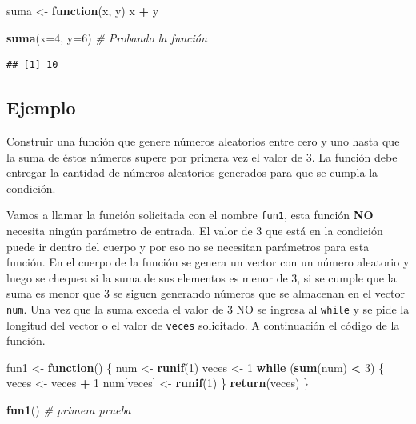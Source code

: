 \documentclass[10pt,]{krantz}
\makeatletter
\newenvironment{Shaded}{\begin{snugshade}}{\end{snugshade}}
\newcommand{\KeywordTok}[1]{\textcolor[rgb]{0.13,0.29,0.53}{\textbf{#1}}}
\newcommand{\DataTypeTok}[1]{\textcolor[rgb]{0.13,0.29,0.53}{#1}}
\newcommand{\DecValTok}[1]{\textcolor[rgb]{0.00,0.00,0.81}{#1}}
\newcommand{\StringTok}[1]{\textcolor[rgb]{0.31,0.60,0.02}{#1}}
\newcommand{\CommentTok}[1]{\textcolor[rgb]{0.56,0.35,0.01}{\textit{#1}}}
\newcommand{\ControlFlowTok}[1]{\textcolor[rgb]{0.13,0.29,0.53}{\textbf{#1}}}
\newcommand{\OperatorTok}[1]{\textcolor[rgb]{0.81,0.36,0.00}{\textbf{#1}}}
\newcommand{\NormalTok}[1]{#1}
\newenvironment{kframe}{%
\medskip{}
\setlength{\fboxsep}{.8em}
 \def\at@end@of@kframe{}%
 \ifinner\ifhmode%
  \def\at@end@of@kframe{\end{minipage}}%
  \begin{minipage}{\columnwidth}%
 \fi\fi%
 \def\FrameCommand##1{\hskip\@totalleftmargin \hskip-\fboxsep
 \colorbox{shadecolor}{##1}\hskip-\fboxsep
     \hskip-\linewidth \hskip-\@totalleftmargin \hskip\columnwidth}%
 \MakeFramed {\advance\hsize-\width
   \@totalleftmargin\z@ \linewidth\hsize
   \@setminipage}}%
 {\par\unskip\endMakeFramed%
 \at@end@of@kframe}
\renewenvironment{Shaded}{\begin{kframe}}{\end{kframe}}
\makeatother
\begin{document}
\begin{Shaded}
\begin{Highlighting}[]
\NormalTok{suma <-}\StringTok{ }\ControlFlowTok{function}\NormalTok{(x, y) x }\OperatorTok{+}\StringTok{ }\NormalTok{y}

\KeywordTok{suma}\NormalTok{(}\DataTypeTok{x=}\DecValTok{4}\NormalTok{, }\DataTypeTok{y=}\DecValTok{6}\NormalTok{)  }\CommentTok{# Probando la función}
\end{Highlighting}
\end{Shaded}

\begin{verbatim}
## [1] 10
\end{verbatim}

\subsection*{Ejemplo}\label{ejemplo-21}


Construir una función que genere números aleatorios entre cero y uno
hasta que la suma de éstos números supere por primera vez el valor de 3.
La función debe entregar la cantidad de números aleatorios generados
para que se cumpla la condición.

Vamos a llamar la función solicitada con el nombre \texttt{fun1}, esta
función \textbf{NO} necesita ningún parámetro de entrada. El valor de 3
que está en la condición puede ir dentro del cuerpo y por eso no se
necesitan parámetros para esta función. En el cuerpo de la función se
genera un vector con un número aleatorio y luego se chequea si la suma
de sus elementos es menor de 3, si se cumple que la suma es menor que 3
se siguen generando números que se almacenan en el vector \texttt{num}.
Una vez que la suma exceda el valor de 3 NO se ingresa al \texttt{while}
y se pide la longitud del vector o el valor de \texttt{veces}
solicitado. A continuación el código de la función.

\begin{Shaded}
\begin{Highlighting}[]
\NormalTok{fun1 <-}\StringTok{ }\ControlFlowTok{function}\NormalTok{() \{}
\NormalTok{  num <-}\StringTok{ }\KeywordTok{runif}\NormalTok{(}\DecValTok{1}\NormalTok{)}
\NormalTok{  veces <-}\StringTok{ }\DecValTok{1}
  \ControlFlowTok{while}\NormalTok{ (}\KeywordTok{sum}\NormalTok{(num) }\OperatorTok{<}\StringTok{ }\DecValTok{3}\NormalTok{) \{}
\NormalTok{    veces <-}\StringTok{ }\NormalTok{veces }\OperatorTok{+}\StringTok{ }\DecValTok{1}
\NormalTok{    num[veces] <-}\StringTok{ }\KeywordTok{runif}\NormalTok{(}\DecValTok{1}\NormalTok{)}
\NormalTok{  \}}
  \KeywordTok{return}\NormalTok{(veces)}
\NormalTok{\}}

\KeywordTok{fun1}\NormalTok{()  }\CommentTok{# primera prueba}
\end{Highlighting}
\end{Shaded}
\end{document}
